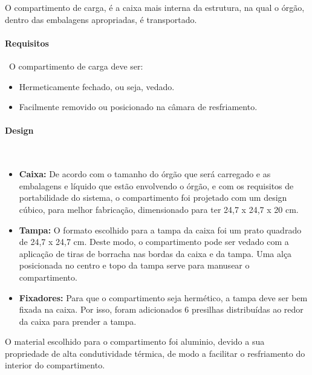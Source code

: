 O compartimento de carga, é a caixa mais interna da estrutura, na qual o órgão, dentro das embalagens apropriadas, é transportado.

\paragraph*{Requisitos}\
O compartimento de carga deve ser:

\begin{itemize}
\item Hermeticamente fechado, ou seja, vedado.
\item Facilmente removido ou posicionado na câmara de resfriamento.
\end{itemize}

\paragraph*{Design}\
\begin{itemize}
\item \textbf{Caixa:} De acordo com o tamanho do órgão que será carregado e as embalagens e líquido que estão envolvendo o órgão, e com os requisitos de portabilidade do sistema, o compartimento foi projetado com um design cúbico, para melhor fabricação, dimensionado para ter 24,7 x 24,7 x 20 cm.
\item \textbf{Tampa:} O formato escolhido para a tampa da caixa foi um prato quadrado de 24,7 x 24,7 cm. Deste modo, o compartimento pode ser vedado com a aplicação de tiras de borracha nas bordas da caixa e da tampa. Uma alça posicionada no centro e topo da tampa serve para manusear o compartimento.
\item \textbf{Fixadores:} Para que o compartimento seja hermético, a tampa deve ser bem fixada na caixa. Por isso, foram adicionados 6 presilhas distribuídas ao redor da caixa para prender a tampa.
\end{itemize}

O material escolhido para o compartimento foi aluminio, devido a sua propriedade de alta condutividade térmica, de modo a facilitar o resfriamento do interior do compartimento.

